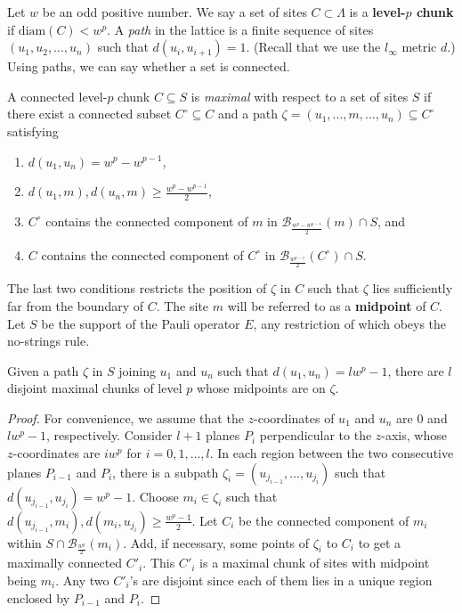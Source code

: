 Let $w$ be an odd positive number.
We say a set of sites $C \subset \Lambda$ is a {\bf level-$p$ chunk} if $\mathrm{diam}(C) < w^p$.
A \emph{path} in the lattice is a finite sequence of sites $(u_1,u_2,\ldots,u_n)$ such that $d(u_i,u_{i+1})=1$.
(Recall that we use the $l_\infty$ metric $d$.)
Using paths, we can say whether a set is connected.

\begin{defn}
A connected level-$p$ chunk $C \subseteq S$ is \emph{maximal} with respect to a set of sites $S$
if there exist a connected subset $C^\circ \subseteq C$
and a path $\zeta = (u_1,\ldots,m,\ldots,u_n) \subseteq C^\circ$ satisfying
\begin{enumerate}
 \item[(i)]   $d(u_1,u_n)=w^p-w^{p-1}$,
 \item[(ii)]  $d(u_1,m),d(u_n,m)\ge \frac{w^p-w^{p-1}}{2}$,
 \item[(iii)]  $C^\circ$ contains the connected component of $m$ in $\mathcal{B}_{\frac{w^{p}-w^{p-1}}{2}}(m) \cap S$, and
 \item[(iv)] $C$ contains the connected component of $C^\circ$ in $\mathcal{B}_{\frac{w^{p-1}}{2}}(C^\circ)\cap S$.
\end{enumerate}
\end{defn}

The last two conditions restricts the position of $\zeta$ in $C$ such that $\zeta$ lies sufficiently far from the boundary of $C$.
The site $m$ will be referred to as a {\bf midpoint} of $C$.
Let $S$ be the support of the Pauli operator $E$,
any restriction of which obeys the no-strings rule.

\begin{lem}
Given a path $\zeta$ in $S$ joining $u_1$ and $u_n$ such that $d(u_1,u_n)=lw^p-1$,
there are $l$ disjoint maximal chunks of level $p$ whose midpoints are on $\zeta$.
\label{lem:max_chunks_on_path}
\end{lem}
\begin{proof}
For convenience, we assume that the $z$-coordinates of $u_1$ and $u_n$ are
$0$ and $lw^p-1$, respectively.
Consider $l+1$ planes $P_i$ perpendicular to the $z$-axis, whose $z$-coordinates are $iw^p$ for $i=0,1,\ldots,l$.
In each region between the two consecutive planes $P_{i-1}$ and $P_i$,
there is a subpath $\zeta_i=(u_{j_{i-1}},\ldots,u_{j_{i}})$ such that $d(u_{j_{i-1}},u_{j_{i}})=w^p-1$.
Choose $m_i \in \zeta_i$ such that $d(u_{j_{i-1}},m_i),d(m_i,u_{j_{i}}) \ge \frac{w^p -1}{2}$.
Let $C_i$ be the connected component of $m_i$ within $S \cap \mathcal B_{\frac{w^p}{2}}(m_i)$.
Add, if necessary, some points of $\zeta_i$ to $C_i$ to get a maximally connected $C'_i$.
This $C'_i$ is a maximal chunk of sites with midpoint being $m_i$.
Any two $C'_i$'s are disjoint since each of them lies in a unique region enclosed by $P_{i-1}$ and $P_i$.
\end{proof}



